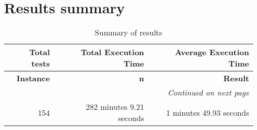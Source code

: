 \section{Results summary}
 \begin{longtable}{rrr} \caption{Summary of results}\label{table:results_summary}\\ \toprule \textbf{Total tests}& \textbf{Total Execution Time}& \textbf{Average Execution Time}\\
\midrule
\endfirsthead
\toprule
\textbf{Instance} & \textbf{n} & \textbf{Result} \\
\midrule
\endhead
\midrule
\multicolumn{3}{r}{\textit{Continued on next page}} \\
\midrule
\endfoot
\bottomrule
\endlastfoot

154 & 282 minutes 9.21 seconds & 1 minutes 49.93 seconds \\

\end{longtable}

